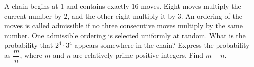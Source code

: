 A chain begins at $1$ and contains exactly $16$ moves. Eight moves multiply the current number by $2$, and the other eight multiply it by $3$. An ordering of the moves is called admissible if no three consecutive moves multiply by the same number. One admissible ordering is selected uniformly at random. What is the probability that $2^4\cdot3^4$ appears somewhere in the chain? Express the probability as $\dfrac{m}{n}$, where $m$ and $n$ are relatively prime positive integers. Find $m+n$.

